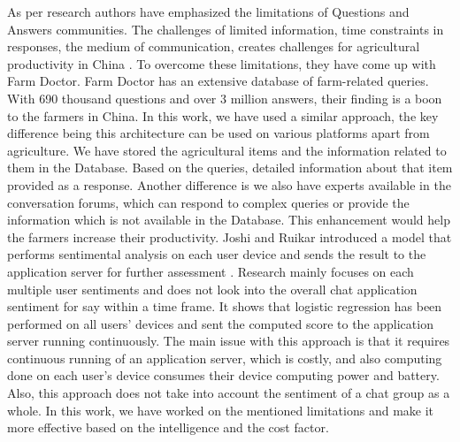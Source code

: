 \documentclass[10pt,conference]{IEEEtran}
\begin{document}
{As per research \cite{singh2020plantdoc} authors have emphasized the limitations of Questions and Answers communities. The challenges of limited information, time constraints in responses, the medium of communication, creates challenges for agricultural productivity in China \cite{sulistyantoeffectiveness}. To overcome these limitations, they have come up with Farm Doctor. Farm Doctor has an extensive database of farm-related queries. With 690 thousand questions and over 3 million answers, their finding is a boon to the farmers in China. In this work, we have used a similar approach, the key difference being this architecture can be used on various platforms apart from agriculture. We have stored the agricultural items and the information related to them in the Database. Based on the queries, detailed information about that item provided as a response. Another difference is we also have experts available in the conversation forums, which can respond to complex queries or provide the information which is not available in the Database. This enhancement would help the farmers increase their productivity.
\newline
\newline
Joshi and Ruikar introduced a model that performs sentimental analysis on each user device and sends the result to the application server for further assessment \cite{joshi2019sentiment}. Research mainly focuses on each multiple user sentiments and does not look into the overall chat application sentiment for say within a time frame. It shows that logistic regression has been performed on all users’ devices and sent the computed score to the application server running continuously. The main issue with this approach is that it requires continuous running of an application server, which is costly, and also computing done on each user's device consumes their device computing power and battery. Also, this approach does not take into account the sentiment of a chat group as a whole. In this work, we have worked on the mentioned limitations and make it more effective based on the intelligence and the cost factor.
\newline
\newline
}
\end{document}

